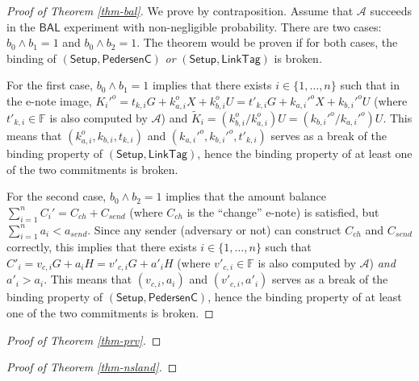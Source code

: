 \documentclass{article}
\begin{document}
\begin{proof}[Proof of Theorem \ref{thm-bal}]
We prove by contraposition. Assume that $\mathcal{A}$ succeeds in the $\textsf{BAL}$ experiment with non-negligible probability. There are two cases: $b_0 \wedge b_1 = 1$ and $b_0 \wedge b_2 = 1$. The theorem would be proven if for both cases, the binding of $(\textsf{Setup},\textsf{PedersenC})$ \textit{or} $(\textsf{Setup}, \textsf{LinkTag})$ is broken.

For the first case, $b_0 \wedge b_1 = 1$ implies that there exists $i\in\{1,\ldots,n\}$ such that in the e-note image, $K_i'^o = t_{k,i} G + k_{a,i}^o X + k_{b,i}^o U = t'_{k,i} G + k_{a,i}'^o X + k_{b,i}'^o U$ (where $t'_{k,i}\in\mathbb{F}$ is also computed by $\mathcal{A}$) and $\tilde{K}_i = (k_{b,i}^o/k_{a,i}^o)U = (k_{b,i}'^o/k_{a,i}'^o)U$. This means that $(k_{a,i}^o, k_{b,i}, t_{k,i})$ and $( k_{a,i}'^o, k_{b,i}'^o, t'_{k,i})$ serves as a break of the binding property of $(\textsf{Setup}, \textsf{LinkTag})$, hence the binding property of at least one of the two commitments is broken.

For the second case,  $b_0 \wedge b_2 = 1$ implies that the amount balance $\sum_{i=1}^n{C_i'}=C_{ch}+C_{send}$ (where $C_{ch}$ is the ``change'' e-note) is satisfied, but $\sum_{i=1}^n{a_i} < a_{send}$. Since any sender (adversary or not) can construct $C_{ch}$ and $C_{send}$ correctly, this implies that there exists $i\in\{1,\ldots,n\}$ such that $C'_i = v_{c,i} G + a_i H = v'_{c,i} G + a'_i H$ (where $v'_{c,i}\in\mathbb{F}$ is also computed by $\mathcal{A}$) \textit{and} $a'_i > a_i$. This means that $( v_{c,i}, a_i)$ and $(v'_{c,i}, a'_i)$ serves as a break of the binding property of $(\textsf{Setup}, \textsf{PedersenC})$, hence the binding property of at least one of the two commitments is broken.
\end{proof}
\begin{proof}[Proof of Theorem \ref{thm-prv}]
\end{proof}
\begin{proof}[Proof of Theorem \ref{thm-nsland}]
\end{proof}
\end{document}
